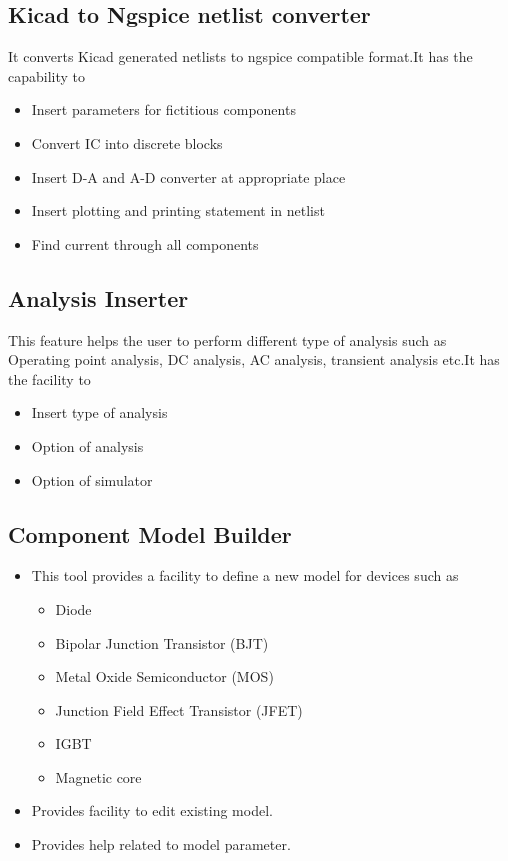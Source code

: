 \subsection {Kicad to Ngspice netlist converter}
It converts Kicad generated netlists to ngspice compatible format.It has the capability to

\begin{itemize}
\item Insert parameters for fictitious components
\item Convert IC into discrete blocks
\item Insert D-A and A-D converter at appropriate place
\item Insert plotting and printing statement in netlist
\item Find current through all components
\end{itemize}

\subsection {Analysis Inserter}
This feature helps the user to perform different type of analysis such as Operating point analysis, DC analysis, AC analysis, transient analysis etc.It has the facility to

\begin{itemize}
\item Insert type of analysis
\item Option of analysis
\item Option of simulator
\end{itemize}

\subsection {Component Model Builder}
\begin{itemize}
\item This tool provides a facility to define a new model for devices such as 
\begin{itemize}
            \item Diode
            \item Bipolar Junction Transistor (BJT)
            \item Metal Oxide Semiconductor (MOS)
            \item Junction Field Effect Transistor (JFET)
            \item IGBT
            \item Magnetic core
\end{itemize}
\item  Provides facility to edit existing model.
\item  Provides help related to model parameter.
\end{itemize}
 
